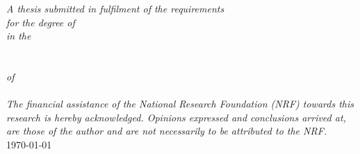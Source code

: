 \documentclass[
11pt, %
english, %
onehalfspacing, %
headsepline, %
]{RhodesThesis} %
\theoremstyle{customdefstyle}
\begin{document}
\begin{titlepage}
\begin{center}
    \large \textit{A thesis submitted in fulfilment of the requirements\\ for the degree of }\degreename \\[0.3cm] %
    \textit{in the}\\[0.3cm]
    \groupname\\\deptname\\[0.3cm] %
    \textit{of}\\[0.3cm]
    \univname\\[0.3cm]

    \large \textit{The financial assistance of the National Research Foundation (NRF) towards this research is hereby acknowledged. Opinions expressed and conclusions arrived at, are those of the author and are not necessarily to be attributed to the NRF.}\\[0.2cm]
    {\large \monthyeardate\today}\\[4cm] %

    \vfill
  \end{center}
\end{titlepage}

\let\cleardoublepage\clearpage

\end{document}
